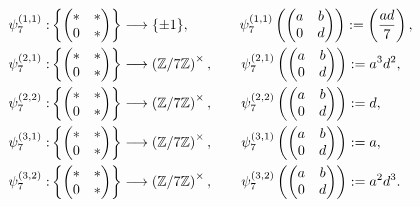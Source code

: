 \begin{equation} \label{fiberingsinlevel28case}
\begin{split}
\psi_7^{(1,1)} : &\left\{ \begin{pmatrix} * & * \\ 0 & * \end{pmatrix} \right\} \longrightarrow \{ \pm 1 \}, \quad\quad\quad\;\; \psi_7^{(1,1)}\left( \begin{pmatrix} a & b \\ 0 & d \end{pmatrix} \right) := \left( \frac{ad}{7} \right), \\
\psi_7^{(2,1)} : &\left\{ \begin{pmatrix} * & * \\ 0 & * \end{pmatrix} \right\} \longrightarrow \left( \mathbb{Z}/7\mathbb{Z} \right)^\times, \quad\quad \psi_7^{(2,1)}\left( \begin{pmatrix} a & b \\ 0 & d \end{pmatrix} \right) := a^3 d^2, \\
\psi_7^{(2,2)} : &\left\{ \begin{pmatrix} * & * \\ 0 & * \end{pmatrix} \right\} \longrightarrow \left( \mathbb{Z}/7\mathbb{Z} \right)^\times, \quad\quad \psi_7^{(2,2)}\left( \begin{pmatrix} a & b \\ 0 & d \end{pmatrix} \right) := d, \\
\psi_7^{(3,1)} : &\left\{ \begin{pmatrix} * & * \\ 0 & * \end{pmatrix} \right\} \longrightarrow \left( \mathbb{Z}/7\mathbb{Z} \right)^\times, \quad\quad \psi_7^{(3,1)}\left( \begin{pmatrix} a & b \\ 0 & d \end{pmatrix} \right) := a, \\
\psi_7^{(3,2)} : &\left\{ \begin{pmatrix} * & * \\ 0 & * \end{pmatrix} \right\} \longrightarrow \left( \mathbb{Z}/7\mathbb{Z} \right)^\times, \quad\quad \psi_7^{(3,2)}\left( \begin{pmatrix} a & b \\ 0 & d \end{pmatrix} \right) := a^2 d^3.
\end{split}
\end{equation}
